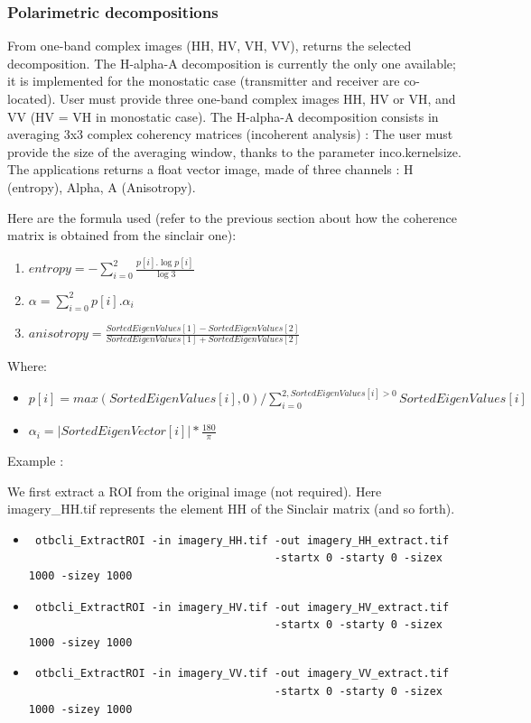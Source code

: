 \subsubsection{Polarimetric decompositions}

From one-band complex images (HH, HV, VH, VV), returns the selected decomposition.
The H-alpha-A decomposition is currently the only one available; it is implemented for the monostatic case (transmitter and receiver are co-located).
User must provide three one-band complex images HH, HV or VH, and VV (HV = VH in monostatic case).
The H-alpha-A decomposition consists in averaging 3x3 complex coherency matrices (incoherent analysis) : 
The user must provide the size of the averaging window, thanks to the parameter inco.kernelsize.
The applications returns a float vector image, made of three channels : H (entropy), Alpha, A (Anisotropy).

Here are the formula used (refer to the previous section about how the coherence matrix is obtained from the sinclair one):
\begin{enumerate}
\renewcommand{\labelenumii}{Channel \arabic{enumii} : }
\item $ entropy = -\sum_{i=0}^{2} \frac{p[i].\log{p[i]}}{\log{3}} $
\item $ \alpha = \sum_{i=0}^{2} p[i].\alpha_{i} $
\item $ anisotropy = \frac {SortedEigenValues[1] - SortedEigenValues[2]}{SortedEigenValues[1] + SortedEigenValues[2]} $
\end{enumerate}

Where:
\begin{itemize}
\item $ p[i] = max(SortedEigenValues[i], 0) / \sum_{i=0}^{2, SortedEigenValues[i]>0} SortedEigenValues[i] $
\item $ \alpha_{i} = \left| SortedEigenVector[i] \right|* \frac{180}{\pi}$
\end{itemize}


Example :

We first extract a ROI from the original image (not required). 
Here imagery\_HH.tif represents the element HH of the Sinclair matrix (and so forth).

\begin{itemize}
\item \begin{verbatim} otbcli_ExtractROI -in imagery_HH.tif -out imagery_HH_extract.tif  
									  -startx 0 -starty 0 -sizex 1000 -sizey 1000 \end{verbatim}
									  
\item \begin{verbatim} otbcli_ExtractROI -in imagery_HV.tif -out imagery_HV_extract.tif  
									  -startx 0 -starty 0 -sizex 1000 -sizey 1000 \end{verbatim}
									  
\item \begin{verbatim} otbcli_ExtractROI -in imagery_VV.tif -out imagery_VV_extract.tif  
									  -startx 0 -starty 0 -sizex 1000 -sizey 1000 \end{verbatim}
\end{itemize}

